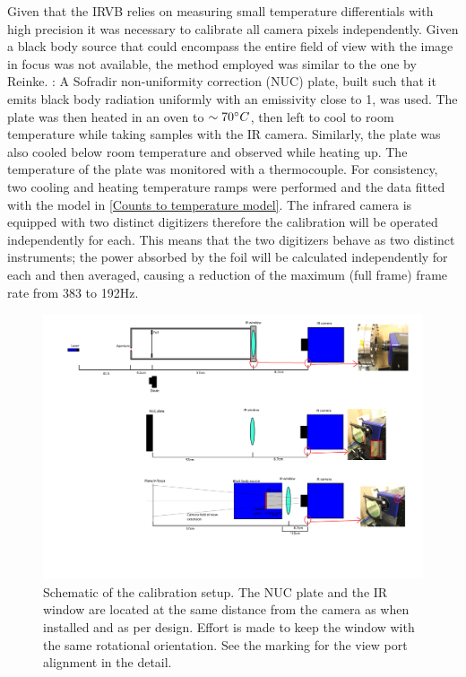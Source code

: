 Given that the IRVB relies on measuring small temperature differentials with high precision it was necessary to calibrate all camera pixels independently. Given a black body source that could encompass the entire field of view with the image in focus was not available, the method employed was similar to the one by Reinke. \cite{Reinke2018a}: A Sofradir non-uniformity correction (NUC) plate, built such that it emits black body radiation uniformly with an emissivity close to 1, was used. The plate was then heated in an oven to $\sim70\degree C$, then left to cool to room temperature while taking samples with the IR camera. Similarly, the plate was also cooled below room temperature and observed while heating up. The temperature of the plate was monitored with a thermocouple. For consistency, two cooling and heating temperature ramps were performed and the data fitted with the model in \autoref{Counts to temperature model}.
The infrared camera is equipped with two distinct digitizers therefore the calibration will be operated independently for each. This means that the two digitizers behave as two distinct instruments; the power absorbed by the foil will be calculated independently for each and then averaged, causing a reduction of the maximum (full frame) frame rate from 383 to 192Hz.

\begin{figure}
	\centering
	\includegraphics[trim={780 850 280 700},clip,width=\linewidth]{Chapters/chapter2/figs/calib_schematics.png}
	\caption{Schematic of the calibration setup. The NUC plate and the IR window are located at the same distance from the camera as when installed and as per design. Effort is made to keep the window with the same rotational orientation. See the marking for the view port alignment in the detail.}
	\label{fig:BBcalib}
\end{figure}

